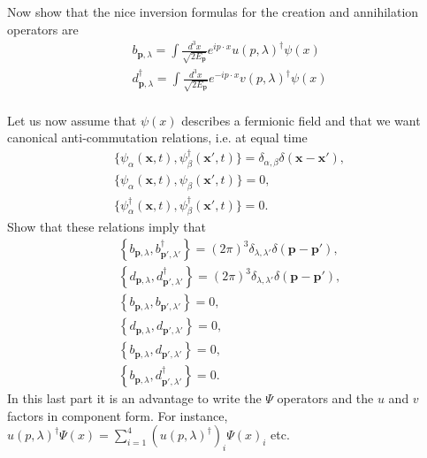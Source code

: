 \documentclass[working, oneside]{../../../Preambles/tuftebook}
\begin{document}
\begin{exercise}[8]
Now show that the nice inversion formulas for the creation and annihilation 
operators are
\begin{align}
&b_{\bm p,\lambda}=\int \frac{d^3x}{\sqrt{2E_{\bm p}}}e^{i p\cdot x}u(p,\lambda)^\dagger\psi(x)&\\
&d_{\bm p,\lambda}^{\dagger}=\int \frac{d^3x}{\sqrt{2E_{\bm p}}}e^{-i p\cdot x}v(p,\lambda)^\dagger\psi(x)&\\
\end{align}
\end{exercise}
\begin{exercise}[9]
Let us now assume that $\psi(x)$ describes a fermionic field and that we want canonical 
anti-commutation relations, i.e. at equal time 
\begin{align}
&\{\psi_{\alpha}(\bm x,t),\psi^{\dagger}_{\beta}(\bm x',t)\}=\delta_{\alpha,\beta}\delta(\bm x-\bm x'),&\\ 
&\{\psi_{\alpha}(\bm x,t),\psi_{\beta}(\bm x',t)^{}\}=0,&\\
&\{\psi_{\alpha}^{\dagger}(\bm x,t),\psi_{\beta}^{\dagger}(\bm x',t)\}=0.&
\end{align}
Show that these relations imply that 
\begin{align}
&\left\{b_{\bm p,\lambda},b_{\bm p',\lambda'}^{\dagger}\right\}=(2\pi)^3\delta_{\lambda,\lambda'}\delta(\bm p-\bm p'),&\\
&\left\{d_{\bm p,\lambda},d_{\bm p',\lambda'}^{\dagger}\right\}=(2\pi)^3\delta_{\lambda,\lambda'}\delta(\bm p-\bm p'),&\\
&\left\{b_{\bm p,\lambda},b_{\bm p',\lambda'}^{}\right\}=0,&\\
&\left\{d_{\bm p,\lambda},d_{\bm p',\lambda'}^{}\right\}=0,&\\
&\left\{b_{\bm p,\lambda},d_{\bm p',\lambda'}^{}\right\}=0,&\\
&\left\{b_{\bm p,\lambda},d_{\bm p',\lambda'}^{\dagger}\right\}=0.&
\end{align}
In this last part it is an advantage to write the $\Psi$ operators and the $u$ and $v$ factors
in component form. For instance, $u(p,\lambda)^{\dagger}\Psi(x)=\sum_{i=1}^{4} (u(p,\lambda)^{\dagger})_i\Psi(x)_i$
etc.
\end{exercise}
\end{document}
